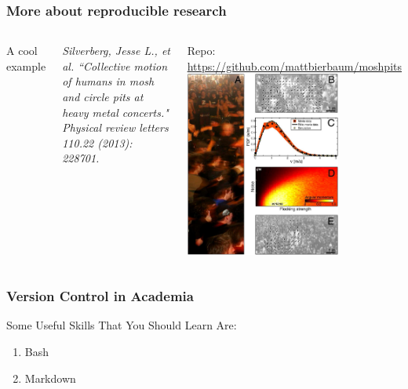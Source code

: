 \begin{frame}
\frametitle{\large{More about reproducible research}}
\begin{columns}[c]
\column{2in}
A cool example

\emph{\small Silverberg, Jesse L., et al. ``Collective motion of humans in mosh and circle pits at heavy metal concerts." Physical review letters 110.22 (2013): 228701.}

\vspace{5mm}
Repo: \url{https://github.com/mattbierbaum/moshpits}
\column{2in}
\includegraphics[width=2in]{img/mosh_physics.png} 
\end{columns}




\end{frame}
\note{}

\begin{frame}
\frametitle{\large{Version Control in Academia}}
Some Useful Skills That You Should Learn Are:
\begin{enumerate}
\item Bash
\item Markdown
\end{enumerate}
\end{frame}
\note{}